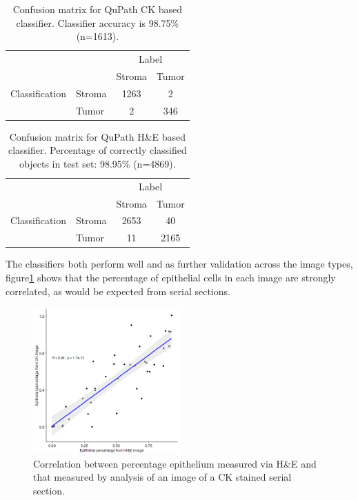 \begin{table}[]
    \centering
    \begin{tabular}{llcc}
    \hline
    & & \multicolumn{2}{c}{Label}\\
    &   &   Stroma  &   Tumor\\
       \hline
Classification&Stroma   &    1263    &     2\\
&Tumor   &      2     &  346 \\
         
    \end{tabular}
    \caption[Confusion matrix for QuPath CK based classifier.]{Confusion matrix for QuPath CK based classifier. Classifier accuracy is 98.75\% (n=1613).}
    \label{tab:classifier_ck}
\end{table}


\begin{table}[]
    \centering
    \begin{tabular}{llcc}
    \hline
       &           &  \multicolumn{2}{c}{Label}\\
       &           &    Stroma	& Tumor\\ 
\hline
Classification & Stroma	&  2653	 &   40\\
             & Tumor	 &   11	 & 2165\\
 \hline
    \end{tabular}
    \caption[Confusion matrix for QuPath H\&E based classifier.]{Confusion matrix for QuPath H\&E based classifier. Percentage of correctly classified objects in test set: 98.95\% (n=4869).}
    \label{tab:classifier_he}
\end{table}

The classifiers both perform well and as further validation across the image types, figure\ref{fig:correlation_tumourarea} shows that the percentage of epithelial cells in each image are strongly correlated, as would be expected from serial sections. 

\begin{figure}
    \centering
    \includegraphics[width=0.5\textwidth]{Chapter3/Figs/correlation_TS_he_Ck.png}
    \caption{Correlation between percentage epithelium measured via H\&E and that measured by analysis of an image of a CK stained serial section.}
    \label{fig:correlation_tumourarea}
\end{figure}


